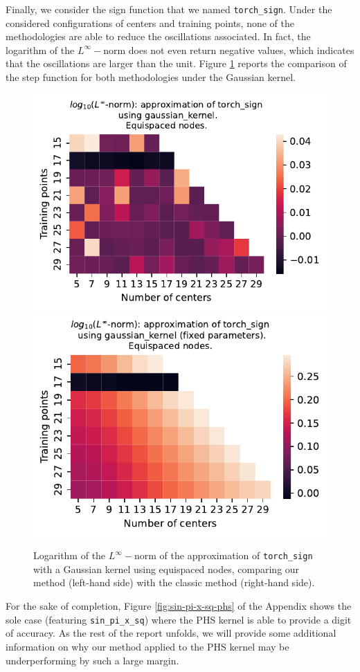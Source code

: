 \documentclass[12pt]{report} %
\begin{document}
Finally, we consider the sign function that we named \texttt{torch\_sign}. Under the considered configurations of centers and training points, none of the methodologies are able to reduce the oscillations associated. In fact, the logarithm of the $L^\infty-$norm does not even return negative values, which indicates that the oscillations are larger than the unit. Figure \ref{fig:torch-sign-gaussian-kernel-equi-comparison-methods} reports the comparison of the step function for both methodologies under the Gaussian kernel.

\begin{figure}[ht]
  \centering
  \includegraphics[width=.49\textwidth]{imagenes/experiments/1d/variational/torch_sign-Kgaussian_kernel-Equi.pdf}
  \includegraphics[width=.49\textwidth]{imagenes/experiments/1d/least_squares/opt-torch_sign-Kgaussian_kernel-Equi.pdf}
  \caption{Logarithm of the $L^\infty-$norm of the approximation of \texttt{torch\_sign} with a Gaussian kernel using equispaced nodes, comparing our method (left-hand side) with the classic method (right-hand side).}
  \label{fig:torch-sign-gaussian-kernel-equi-comparison-methods}
\end{figure}


For the sake of completion, Figure \ref{fig:sin-pi-x-sq-phs} of the Appendix shows the sole case (featuring \texttt{sin\_pi\_x\_sq}) where the PHS kernel is able to provide a digit of accuracy.
As the rest of the report unfolds, we will provide some additional information on why our method applied to the PHS kernel may be underperforming by such a large margin.
\end{document}
